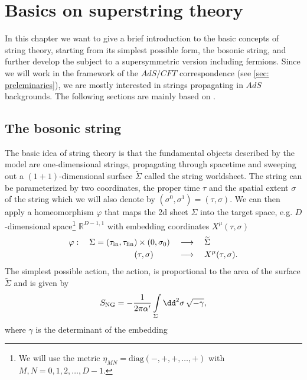 \chapter{Basics on superstring theory}
In this chapter we want to give a brief introduction to the basic concepts of string theory, starting from its simplest possible form, the bosonic string, and further develop the subject to a supersymmetric version including fermions. Since we will work in the framework of the $AdS/CFT$ correspondence (see \autoref{sec: preleminaries}), we are mostly interested in strings propagating in $AdS$ backgrounds. The following sections are mainly based on \cite{Polchinski:1998rq,Polchinski:1998rr,Ammon:2015wua,Becker:2007zj}.
%
%
%
%
%
%
%
\section{The bosonic string}
The basic idea of string theory is that the fundamental objects described by the model are one-dimensional strings, propagating through spacetime and sweeping out a $(1+1)$-dimensional surface $\widetilde{\Sigma}$ called the string worldsheet. The string can be parameterized by two coordinates, the proper time $\tau$ and the spatial extent $\sigma$ of the string which we will also denote by $(\sigma^{0},\sigma^{1})=(\tau,\sigma)$. We can then apply a homeomorphism $\varphi$ that maps the 2d sheet $\Sigma$ into the target space, e.g. $D$-dimensional  space\footnote{We will use the metric $\eta_{MN}=\text{diag}(-,+,+,\ldots,+)$ with $M,N=0,1,2,\ldots,D-1.$} $\mathbb{R}^{D-1,1}$ with embedding coordinates $X^{\mu}(\tau,\sigma)$
%
%
\begin{equation}
\begin{alignedat}{3}
\varphi :\quad  \Sigma = (\tau_{\rm in},\tau_{\rm fin}) \times (0,\sigma_{0}) \quad &\longrightarrow \quad \widetilde{\Sigma} \\
(\tau,\sigma) \qquad\quad &\longrightarrow \quad X^{\mu}(\tau,\sigma).
\end{alignedat}
\end{equation}
%
%
The simplest possible action, the  action, is proportional to the area of the surface $\widetilde{\Sigma}$ and is given by
%
%
\begin{equation}
S_{\rm NG} = -\frac{1}{2\pi\alpha'} \int\limits_{\Sigma} \dd^{2}\sigma \, \sqrt{-\gamma},
\end{equation}
%
%
where $\gamma$ is the  determinant of the embedding
